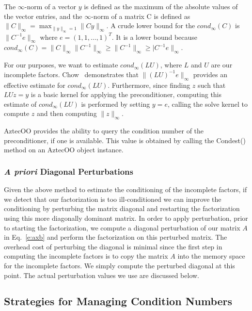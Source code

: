 \documentclass[12pt,relax]{AztecOOUserGuide}
\begin{document}
The $\infty$-norm of a vector $y$ is defined as the maximum of the
absolute values of the vector entries, and the $\infty$-norm of a
matrix C is defined as
$\|C\|_\infty = \max_{\|y\|_\infty = 1} \|Cy\|_\infty$.
A crude lower bound for the $cond_\infty(C)$ is
$\|C^{-1}e\|_\infty$ where $e = (1, 1, \ldots, 1)^T$.  It is a
lower bound because $cond_\infty(C) = \|C\|_\infty\|C^{-1}\|_\infty
\ge \|C^{-1}\|_\infty \ge |C^{-1}e\|_\infty$.

For our purposes, we want to estimate $cond_\infty(LU)$, where $L$ and
$U$ are our incomplete factors.  Chow~\cite{Chow:97} demonstrates that
$\|(LU)^{-1}e\|_\infty$ provides an effective estimate for
$cond_\infty(LU)$.  Furthermore, since finding $z$ such that $LUz = y$
is a basic kernel for applying the preconditioner, computing this
estimate of $cond_\infty(LU)$ is performed by setting $y = e$, calling
the solve kernel to compute $z$ and then
computing $\|z\|_\infty$.

AztecOO provides the ability to query the condition number of the
preconditioner, if one is available.  This value is obtained by
calling the Condest() method on an AztecOO object instance.


\subsubsection{{\it A priori} Diagonal Perturbations}

Given the above method to estimate the conditioning of the incomplete factors,
if we detect that our factorization is too ill-conditioned
we can improve the conditioning by perturbing the matrix diagonal and
restarting the factorization using
this more diagonally dominant matrix.  In order to apply perturbation,
prior to starting
the factorization, we compute a diagonal perturbation of our matrix
$A$ in Eq.~\ref{e:axb} and perform the factorization on this perturbed
matrix.  The overhead cost of perturbing the diagonal is minimal since
the first step in computing the incomplete factors is to copy the
matrix $A$ into the memory space for the incomplete factors.  We
simply compute the perturbed diagonal at this point.  The actual
perturbation values we use are discussed below.


\subsection{Strategies for Managing Condition Numbers}
\end{document}
